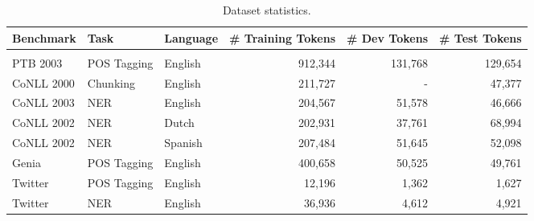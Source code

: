 \documentclass{article} \usepackage{iclr2017_conference,times}
\begin{document}
\begin{table*}[t]
\vspace{-0.1in}
\caption{\small Dataset statistics.}
\label{tab:stat}
\begin{center}
\begin{tabular}{lllrrr}
Benchmark & Task & Language & \# Training Tokens & \# Dev Tokens & \# Test Tokens
\\ \hline \\
PTB 2003 & POS Tagging & English &  912,344 & 131,768 & 129,654 \\
CoNLL 2000 & Chunking & English & 211,727 & - & 47,377 \\
CoNLL 2003 & NER & English & 204,567 & 51,578 & 46,666 \\
CoNLL 2002 & NER & Dutch & 202,931 & 37,761 & 68,994 \\
CoNLL 2002 & NER & Spanish & 207,484 & 51,645 & 52,098 \\
Genia & POS Tagging & English & 400,658 & 50,525 & 49,761 \\
Twitter & POS Tagging & English & 12,196 & 1,362 & 1,627 \\
Twitter & NER & English & 36,936 & 4,612 & 4,921 \\
\end{tabular}
\end{center}
\end{table*}
\end{document}
